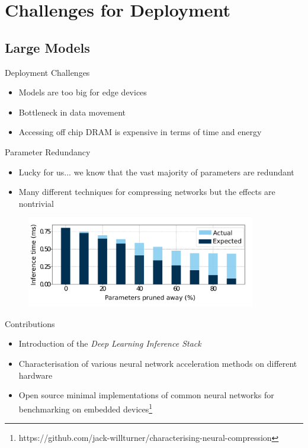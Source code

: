 \documentclass[xcolor=dvipsnames]{beamer}
\begin{document}
\section{Challenges for Deployment}

\subsection{Large Models}

\begin{frame}{Deployment Challenges}

\begin{itemize}
	\item Models are too big for edge devices 
    \item Bottleneck in data movement
    \item Accessing off chip DRAM is expensive in terms of time and energy
\end{itemize}

\end{frame}

\begin{frame}{Parameter Redundancy}



\begin{itemize}
	\item Lucky for us... we know that the vast majority of parameters are redundant 
    \item Many different techniques for compressing networks but the effects are nontrivial
\end{itemize}

\begin{figure}
    \centering
    \includegraphics[width=10cm]{images/speedup.pdf}
\end{figure}



\end{frame}


\begin{frame}{Contributions}
    
    \begin{itemize}
        \item Introduction of the \textit{Deep Learning Inference Stack}
        \item Characterisation of various neural network acceleration methods on different hardware
        \item Open source minimal implementations of common neural networks for benchmarking on embedded devices\footnote{https://github.com/jack-willturner/characterising-neural-compression}
    \end{itemize}
    
\end{frame}
\end{document}
